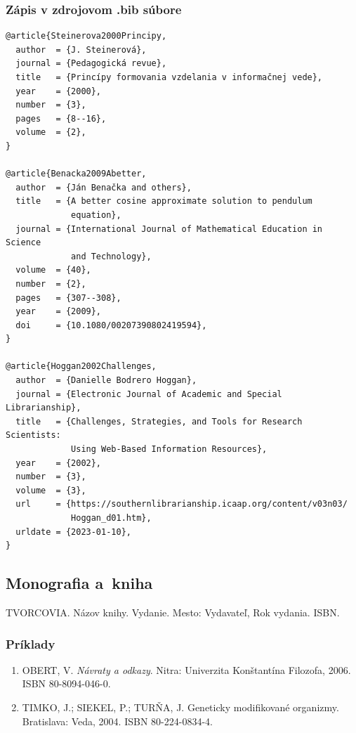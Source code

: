 \subsubsection*{\normalsize Zápis v zdrojovom .bib súbore}
\begin{verbatim}
@article{Steinerova2000Principy,
  author  = {J. Steinerová},
  journal = {Pedagogická revue},
  title   = {Princípy formovania vzdelania v informačnej vede},
  year    = {2000},
  number  = {3},
  pages   = {8--16},
  volume  = {2},
}

@article{Benacka2009Abetter,
  author  = {Ján Benačka and others},
  title   = {A better cosine approximate solution to pendulum
             equation},
  journal = {International Journal of Mathematical Education in Science 
             and Technology},
  volume  = {40},
  number  = {2},
  pages   = {307--308},
  year    = {2009},
  doi     = {10.1080/00207390802419594},
}

@article{Hoggan2002Challenges,
  author  = {Danielle Bodrero Hoggan},
  journal = {Electronic Journal of Academic and Special Librarianship},
  title   = {Challenges, Strategies, and Tools for Research Scientists: 
             Using Web-Based Information Resources},
  year    = {2002},
  number  = {3},
  volume  = {3},
  url     = {https://southernlibrarianship.icaap.org/content/v03n03/
             Hoggan_d01.htm},
  urldate = {2023-01-10},
}
\end{verbatim}

\subsection{Monografia a~kniha}
\begin{trivlist}
\item TVORCOVIA. Názov knihy. Vydanie. Mesto: Vydavateľ, Rok vydania. ISBN.
\end{trivlist}

\subsubsection*{\normalsize Príklady}
\begin{enumerate}
\item OBERT, V. \textit{Návraty a odkazy}. Nitra: Univerzita Konštantína Filozofa, 2006. ISBN 80-8094-046-0.

\item TIMKO, J.; SIEKEL, P.; TURŇA, J. Geneticky modifikované organizmy. Bratislava: Veda, 2004. ISBN 80-224-0834-4.
\end{enumerate}


